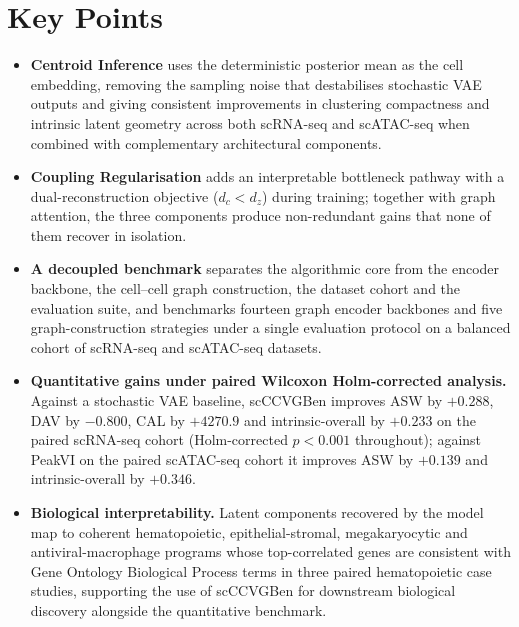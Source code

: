 \documentclass[referee, pdflatex, sn-vancouver-num]{sn-jnl}
\begin{document}

\maketitle

\section*{Key Points}

\begin{itemize}
\item \textbf{Centroid Inference} uses the deterministic posterior mean as the cell embedding, removing the sampling noise that destabilises stochastic VAE outputs and giving consistent improvements in clustering compactness and intrinsic latent geometry across both scRNA-seq and scATAC-seq when combined with complementary architectural components.
\item \textbf{Coupling Regularisation} adds an interpretable bottleneck pathway with a dual-reconstruction objective ($d_c < d_z$) during training; together with graph attention, the three components produce non-redundant gains that none of them recover in isolation.
\item \textbf{A decoupled benchmark} separates the algorithmic core from the encoder backbone, the cell--cell graph construction, the dataset cohort and the evaluation suite, and benchmarks fourteen graph encoder backbones and five graph-construction strategies under a single evaluation protocol on a balanced cohort of scRNA-seq and scATAC-seq datasets.
\item \textbf{Quantitative gains under paired Wilcoxon Holm-corrected analysis.} Against a stochastic VAE baseline, scCCVGBen improves ASW by $+0.288$, DAV by $-0.800$, CAL by $+4270.9$ and intrinsic-overall by $+0.233$ on the paired scRNA-seq cohort (Holm-corrected $p<0.001$ throughout); against PeakVI on the paired scATAC-seq cohort it improves ASW by $+0.139$ and intrinsic-overall by $+0.346$.
\item \textbf{Biological interpretability.} Latent components recovered by the model map to coherent hematopoietic, epithelial-stromal, megakaryocytic and antiviral-macrophage programs whose top-correlated genes are consistent with Gene Ontology Biological Process terms in three paired hematopoietic case studies, supporting the use of scCCVGBen for downstream biological discovery alongside the quantitative benchmark.
\end{itemize}
\end{document}
